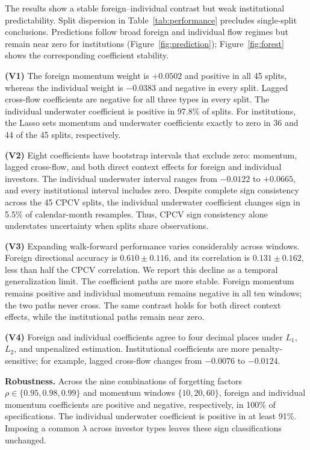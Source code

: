 The results show a stable foreign--individual contrast but weak institutional predictability.
Split dispersion in Table~\ref{tab:performance} precludes single-split conclusions.
Predictions follow broad foreign and individual flow regimes but remain near zero for
institutions (Figure~\ref{fig:prediction}); Figure~\ref{fig:forest} shows the corresponding
coefficient stability.

\textbf{(V1)} The foreign momentum weight is $+0.0502$ and positive in all 45 splits,
whereas the individual weight is $-0.0383$ and negative in every split. Lagged cross-flow
coefficients are negative for all three types in every split. The individual underwater
coefficient is positive in 97.8\% of splits. For institutions, the Lasso sets momentum and
underwater coefficients exactly to zero in 36 and 44 of the 45 splits, respectively.

\textbf{(V2)} Eight coefficients have bootstrap intervals that exclude zero: momentum,
lagged cross-flow, and both direct context effects for foreign and individual investors.
The individual underwater interval ranges from $-0.0122$ to $+0.0665$, and every
institutional interval includes zero. Despite complete sign consistency across the 45 CPCV
splits, the individual underwater coefficient changes sign in 5.5\% of calendar-month
resamples. Thus, CPCV sign consistency alone understates uncertainty when splits share
observations.

\textbf{(V3)} Expanding walk-forward performance varies considerably across windows.
Foreign directional accuracy is $0.610\pm0.116$, and its correlation is
$0.131\pm0.162$, less than half the CPCV correlation. We report this decline as a temporal
generalization limit. The coefficient paths are more stable. Foreign momentum remains
positive and individual momentum remains negative in all ten windows; the two paths never
cross. The same contrast holds for both direct context effects, while the institutional
paths remain near zero.

\textbf{(V4)} Foreign and individual coefficients agree to four decimal places under
$L_1$, $L_2$, and unpenalized estimation. Institutional coefficients are more
penalty-sensitive; for example, lagged cross-flow changes from $-0.0076$ to $-0.0124$.

\textbf{Robustness.} Across the nine combinations of forgetting factors
$\rho\in\{0.95,0.98,0.99\}$ and momentum windows $\{10,20,60\}$, foreign and individual
momentum coefficients are positive and negative, respectively, in 100\% of specifications.
The individual underwater coefficient is positive in at least 91\%. Imposing a common
$\lambda$ across investor types leaves these sign classifications unchanged.

